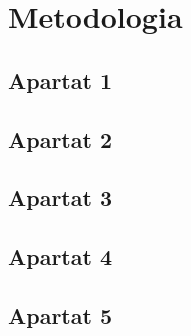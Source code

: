 \section{Metodologia}
\subsection{Apartat 1}

\subsection{Apartat 2}

\subsection{Apartat 3}

\subsection{Apartat 4}

\subsection{Apartat 5}
